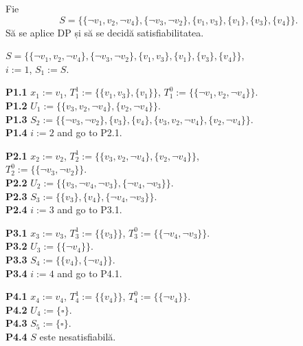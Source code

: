 \begin{ex}
	Fie
	\[
		S = \{\{\neg v_1, v_2, \neg v_4\}, \{\neg v_3, \neg v_2\}, \{v_1, v_3\}, \{v_1\}, \{v_3\}, \{v_4\}\}.
	\]
	Să se aplice DP și să se decidă satisfiabilitatea.
\end{ex}

\begin{solutie}
	\noindent \(S = \{\{\neg v_1, v_2, \neg v_4\}, \{\neg v_3, \neg v_2\}, \{v_1, v_3\}, \{v_1\}, \{v_3\}, \{v_4\}\}\),\\
	\noindent \(i := 1\), \(S_1 := S\).

	\noindent \textbf{P1.1} \(x_1 := v_1\), \(T_1^1 := \{\{v_1, v_3\}, \{v_1\}\}\), \(T_1^0 := \{\{\neg v_1, v_2, \neg v_4\}\}\).\\
	\textbf{P1.2} \(U_1 := \{\{v_3, v_2, \neg v_4\}, \{v_2, \neg v_4\}\}\).\\
	\textbf{P1.3} \(S_2 := \{\{\neg v_3, \neg v_2\}, \{v_3\}, \{v_4\}, \{v_3, v_2, \neg v_4\}, \{v_2, \neg v_4\}\}\).\\
	\textbf{P1.4} \(i := 2\) and go to P2.1.

	\vspace{0.2cm}
	\noindent \textbf{P2.1} \(x_2 := v_2\), \(T_2^1 := \{\{v_3, v_2, \neg v_4\}, \{v_2, \neg v_4\}\}\),\\
	\noindent \(T_2^0 := \{\{\neg v_3, \neg v_2\}\}\).\\
	\textbf{P2.2} \(U_2 := \{\{v_3, \neg v_4, \neg v_3\}, \{\neg v_4, \neg v_3\}\}\).\\
	\textbf{P2.3} \(S_3 := \{\{v_3\}, \{v_4\}, \{\neg v_4, \neg v_3\}\}\).\\
	\textbf{P2.4} \(i := 3\) and go to P3.1.

	\vspace{0.2cm}
	\noindent \textbf{P3.1} \(x_3 := v_3\), \(T_3^1 := \{\{v_3\}\}\), \(T_3^0 := \{\{\neg v_4, \neg v_3\}\}\).\\
	\textbf{P3.2} \(U_3 := \{\{\neg v_4\}\}\).\\
	\textbf{P3.3} \(S_4 := \{\{v_4\}, \{\neg v_4\}\}\).\\
	\textbf{P3.4} \(i := 4\) and go to P4.1.

	\vspace{0.2cm}
	\noindent \textbf{P4.1} \(x_4 := v_4\), \(T_4^1 := \{\{v_4\}\}\), \(T_4^0 := \{\{\neg v_4\}\}\).\\
	\textbf{P4.2} \(U_4 := \{\square\}\).\\
	\textbf{P4.3} \(S_5 := \{\square\}\).\\
	\textbf{P4.4} \(S\) este nesatisfiabilă.
\end{solutie}

